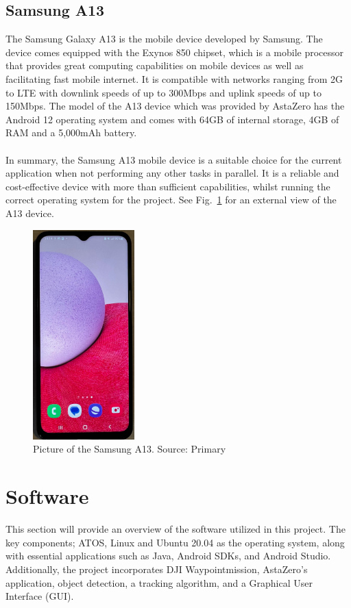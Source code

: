 \subsection{Samsung A13} \label{Samsung}
The Samsung Galaxy A13 is the mobile device developed by Samsung. The device comes equipped with the Exynos 850 chipset, which is a mobile processor that provides great computing capabilities \cite{a13_chipset} on mobile devices as well as facilitating fast mobile internet. It is compatible with networks ranging from 2G to LTE with downlink speeds of up to 300Mbps and uplink speeds of up to 150Mbps. The model of the A13 device which was provided by AstaZero has the Android 12 operating system and comes with 64GB of internal storage, 4GB of RAM and a 5,000mAh battery. 
\\ \\
In summary, the Samsung A13 mobile device is a suitable choice for the current application when not performing any other tasks in parallel. It is a reliable and cost-effective device with more than sufficient capabilities, whilst running the correct operating system for the project. See Fig.~\ref{fig:samsung_a13} for an external view of the A13 device.  

\begin{figure}[h!]
\centering
 \includegraphics[width=0.35\textwidth,angle =270]{figure/345610209_239776231969766_5365333810102475276_n.jpg}
\caption{Picture of the Samsung A13. Source: Primary}
\label{fig:samsung_a13}
\end{figure}


\section{Software} \label{Software}
This section will provide an overview of the software utilized in this project. The key components; ATOS, Linux and Ubuntu 20.04 as the operating system, along with essential applications such as Java, Android SDKs, and Android Studio. Additionally, the project incorporates DJI Waypointmission, AstaZero's application, object detection, a tracking algorithm, and a Graphical User Interface (GUI).

